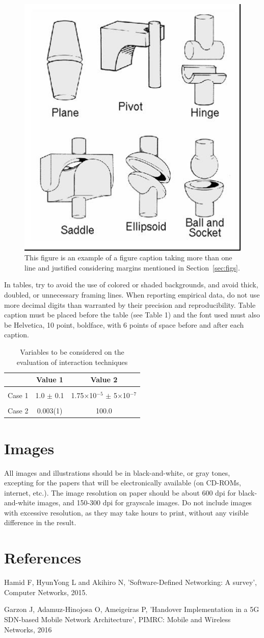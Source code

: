 \documentclass[12pt]{article}
\begin{document}
\begin{figure}[ht]
\centering
\includegraphics[width=.3\textwidth]{fig2.jpg}
\caption{This figure is an example of a figure caption taking more than one
  line and justified considering margins mentioned in Section~\ref{sec:figs}.}
\label{fig:exampleFig2}
\end{figure}

In tables, try to avoid the use of colored or shaded backgrounds, and avoid
thick, doubled, or unnecessary framing lines. When reporting empirical data,
do not use more decimal digits than warranted by their precision and
reproducibility. Table caption must be placed before the table (see Table 1)
and the font used must also be Helvetica, 10 point, boldface, with 6 points of
space before and after each caption.

\begin{table}[ht]
\centering
\caption{Variables to be considered on the evaluation of interaction
  techniques}
\label{tab:exTable1}
\smallskip
\begin{tabular}{|l|c|c|}
\hline
& Value 1 & Value 2\\[0.5ex]
\hline
&&\\[-2ex]
Case 1 & 1.0 $\pm$ 0.1 & 1.75$\times$10$^{-5}$ $\pm$ 5$\times$10$^{-7}$\\[0.5ex]
\hline
&&\\[-2ex]
Case 2 & 0.003(1) & 100.0\\[0.5ex]
\hline
\end{tabular}
\end{table}

\section{Images}

All images and illustrations should be in black-and-white, or gray tones,
excepting for the papers that will be electronically available (on CD-ROMs,
internet, etc.). The image resolution on paper should be about 600 dpi for
black-and-white images, and 150-300 dpi for grayscale images.  Do not include
images with excessive resolution, as they may take hours to print, without any
visible difference in the result. 

\section{References}
      Hamid F, HyunYong L and Akihiro N, ’Software-Defined Networking: A survey’, Computer Networks, 2015.

      Garzon J, Adamuz-Hinojosa O, Ameigeiras P, ’Handover Implementation in a 5G SDN-based Mobile Network Architecture’, PIMRC: Mobile and Wireless Networks, 2016



\end{document}
